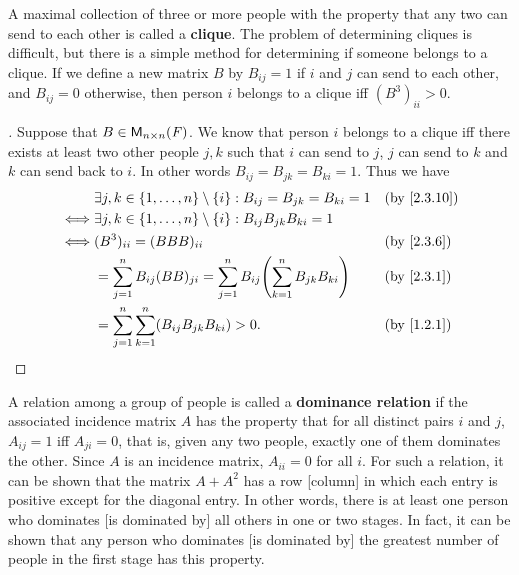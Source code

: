 \begin{eg}\label{2.3.10}
  A maximal collection of three or more people with the property that any two can send to each other is called a \textbf{clique}.
  The problem of determining cliques is difficult, but there is a simple method for determining if someone belongs to a clique.
  If we define a new matrix \(B\) by \(B_{i j} = 1\) if \(i\) and \(j\) can send to each other, and \(B_{i j} = 0\) otherwise, then person \(i\) belongs to a clique iff \((B^3)_{i i} > 0\).
\end{eg}

\begin{proof}[]
  Suppose that \(B \in \ms[n][n][\F]\).
  We know that person \(i\) belongs to a clique iff there exists at least two other people \(j, k\) such that \(i\) can send to \(j\), \(j\) can send to \(k\) and \(k\) can send back to \(i\).
  In other words \(B_{i j} = B_{j k} = B_{k i} = 1\).
  Thus we have
  \begin{align*}
         & \exists j, k \in \set{1, \dots, n} \setminus \set{i} : B_{i j} = B_{j k} = B_{k i} = 1           &  & \by{2.3.10} \\
    \iff & \exists j, k \in \set{1, \dots, n} \setminus \set{i} : B_{i j} B_{j k} B_{k i} = 1                                \\
    \iff & (B^3)_{i i} = (BBB)_{i i}                                                                        &  & \by{2.3.6}  \\
         & = \sum_{j = 1}^n B_{i j} (BB)_{j i} = \sum_{j = 1}^n B_{i j} \pa{\sum_{k = 1}^n B_{j k} B_{k i}} &  & \by{2.3.1}  \\
         & = \sum_{j = 1}^n \sum_{k = 1}^n (B_{i j} B_{j k} B_{k i}) > 0.                                   &  & \by{1.2.1}
  \end{align*}
\end{proof}

\begin{eg}\label{2.3.11}
  A relation among a group of people is called a \textbf{dominance relation} if the associated incidence matrix \(A\) has the property that for all distinct pairs \(i\) and \(j\), \(A_{i j} = 1\) iff \(A_{j i} = 0\), that is, given any two people, exactly one of them dominates the other.
  Since \(A\) is an incidence matrix, \(A_{i i} = 0\) for all \(i\).
  For such a relation, it can be shown that the matrix \(A + A^2\) has a row [column] in which each entry is positive except for the diagonal entry.
  In other words, there is at least one person who dominates [is dominated by] all others in one or two stages.
  In fact, it can be shown that any person who dominates [is dominated by] the greatest number of people in the first stage has this property.
\end{eg}


